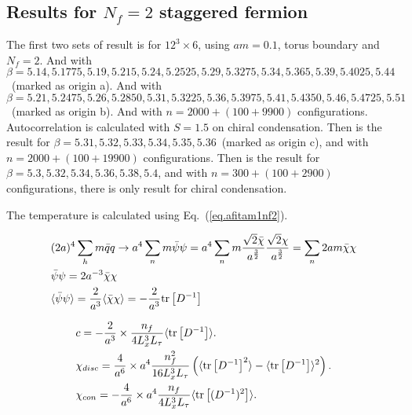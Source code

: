 \subsection{\label{resstaggerednf2}Results for $N_f=2$ staggered fermion}

The first two sets of result is for $12^3 \times 6$, using $am=0.1$, torus boundary and $N_f=2$.
And with $\beta=5.14,5.1775,5.19,5.215,5.24,5.2525,5.29,5.3275,5.34,5.365,5.39,5.4025,5.44$~(marked as origin a).
And with $\beta=5.21,5.2475,5.26,5.2850,5.31,5.3225,5.36,5.3975,5.41,5.4350,5.46,5.4725,5.51$~(marked as origin b).
And with $n=2000+(100+9900)$ configurations.
Autocorrelation is calculated with $S=1.5$ on chiral condensation.
Then is the result for $\beta=5.31,5.32,5.33,5.34,5.35,5.36$~(marked as origin c), and with $n=2000+(100+19900)$ configurations.
Then is the result for $\beta=5.3,5.32,5.34,5.36,5.38,5.4$, and with $n=300+(100+2900)$ configurations, there is only result for chiral condensation.

The temperature is calculated using Eq.~(\ref{eq.afitam1nf2}).

\begin{equation}
\begin{split}
&(2a)^4\sum _{h}m\bar{q}q \to a^4 \sum _n m\bar{\psi}\psi = a^4 \sum _n m\frac{\sqrt{2}\bar{\chi}}{a^{\frac{3}{2}}}\frac{\sqrt{2}\chi}{a^{\frac{3}{2}}}=\sum _n 2am \bar{\chi}\chi \\
&\bar{\psi}\psi=2a^{-3}\bar{\chi}\chi\\
&\langle \bar{\psi}\psi\rangle =\frac{2}{a^3}\langle \bar{\chi}\chi\rangle = -\frac{2}{a^3} {\rm tr}\left[D^{-1}\right]\\
\end{split}
\label{eq.cqdefine}
\end{equation}

\begin{equation}
\begin{split}
&c=-\frac{2}{a^3}\times \frac{n_f}{4L_x^3L_{\tau}}\langle {\rm tr}\left[D^{-1}\right]\rangle.\\
&\chi _{disc}=\frac{4}{a^6} \times a^4\frac{n_f^2}{16L_x^3L_{\tau}}\left(\langle {\rm tr}\left[D^{-1}\right]^2\rangle-\langle {\rm tr}\left[D^{-1}\right]\rangle^2\right).\\
&\chi _{con}=-\frac{4}{a^6} \times a^4\frac{n_f}{4L_x^3L_{\tau}}\langle {\rm tr}\left[(D^{-1})^2\right]\rangle.\\
\end{split}
\label{eq.cqdefine}
\end{equation}

